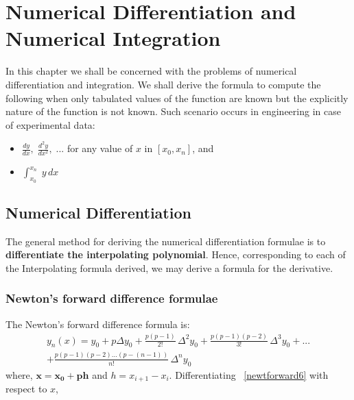 \documentclass[aima203_lecturenotes_ku.tex]{subfiles}
\begin{document}
\chapter{Numerical Differentiation and Numerical Integration}

In this chapter we shall be concerned with the problems of numerical differentiation and integration. We shall derive the formula to compute the following when only tabulated values of the function are known but the explicitly nature of the function is not known. Such scenario occurs in engineering in case of experimental data:

\begin{itemize}
\item $\displaystyle \frac{dy}{dx}, \; \frac{d^2y}{dx^2},\;...$ for any value of $x$ in $[x_0, x_n]$, and

\item $\displaystyle \int_{x_0}^{x_n} \; y\,dx$
\end{itemize}

\section{Numerical Differentiation}
The general method for deriving the numerical differentiation formulae is to \textbf{differentiate the interpolating polynomial}. Hence, corresponding to each of the Interpolating formula derived, we may derive a formula for the derivative.

\subsection{Newton's forward difference formulae}
The Newton's forward difference formula is:
\begin{equation}
  \label{newtforward6}
 \begin{gathered}
  y_n(x) = y_0 + p \Delta y_0 + \frac{p(p-1)}{2!}\, \Delta ^2 y_0 + \frac{p(p-1)(p-2)}{3!}\, \Delta ^3 y_0 + ... \\[1mm]
  + \frac{p(p-1)(p-2)...(p-(n-1))}{n!}\, \Delta ^n y_0
\end{gathered}
\end{equation}
where, $\mathbf{x=x_0 + ph}$ and $h = x_{i+1} - x_{i}$. Differentiating ~\ref{newtforward6} with respect to $x$,
\end{document}
